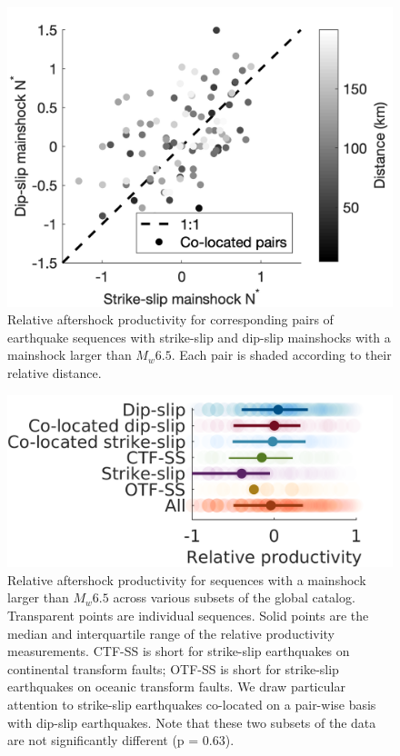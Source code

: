 \documentclass[12pt, notitlepage]{report}
\begin{document}
\begin{figure}
    \centering
    \includegraphics{figures/colocated_res.png}
    \caption{Relative aftershock productivity for corresponding pairs of earthquake sequences with strike-slip and dip-slip mainshocks with a mainshock larger than $M_w6.5$. Each pair is shaded according to their relative distance.}
    \label{fig:coloc}
\end{figure}

\begin{figure}
    \centering
    \includegraphics{figures/nearSS.png}
    \caption{Relative aftershock productivity for sequences with a mainshock larger than $M_w6.5$ across various subsets of the global catalog. Transparent points are individual sequences. Solid points are the median and interquartile range of the relative productivity measurements.  CTF-SS is short for strike-slip earthquakes on continental transform faults; OTF-SS is short for strike-slip earthquakes on oceanic transform faults. We draw particular attention to strike-slip earthquakes co-located on a pair-wise basis with dip-slip earthquakes. Note that these two subsets of the data are not significantly different (p = 0.63).}
    \label{fig:nearSS}
\end{figure}
\end{document}
